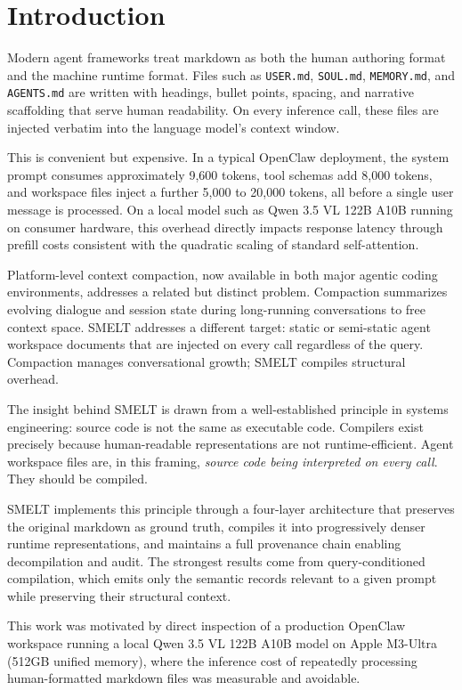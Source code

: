 \documentclass[11pt,a4paper]{article}
\begin{document}
\section{Introduction}

Modern agent frameworks treat markdown as both the human authoring format and the machine runtime format. Files such as \texttt{USER.md}, \texttt{SOUL.md}, \texttt{MEMORY.md}, and \texttt{AGENTS.md} are written with headings, bullet points, spacing, and narrative scaffolding that serve human readability. On every inference call, these files are injected verbatim into the language model's context window.

This is convenient but expensive. In a typical OpenClaw \citep{openclaw2026} deployment, the system prompt consumes approximately 9,600 tokens, tool schemas add 8,000 tokens, and workspace files inject a further 5,000 to 20,000 tokens, all before a single user message is processed. On a local model such as Qwen 3.5 VL 122B A10B running on consumer hardware, this overhead directly impacts response latency through prefill costs consistent with the quadratic scaling of standard self-attention.

Platform-level context compaction, now available in both major agentic coding environments, addresses a related but distinct problem. Compaction summarizes evolving dialogue and session state during long-running conversations to free context space. SMELT addresses a different target: static or semi-static agent workspace documents that are injected on every call regardless of the query. Compaction manages conversational growth; SMELT compiles structural overhead.

The insight behind SMELT is drawn from a well-established principle in systems engineering: source code is not the same as executable code. Compilers exist precisely because human-readable representations are not runtime-efficient. Agent workspace files are, in this framing, \textit{source code being interpreted on every call}. They should be compiled.

SMELT implements this principle through a four-layer architecture that preserves the original markdown as ground truth, compiles it into progressively denser runtime representations, and maintains a full provenance chain enabling decompilation and audit. The strongest results come from query-conditioned compilation, which emits only the semantic records relevant to a given prompt while preserving their structural context.

This work was motivated by direct inspection of a production OpenClaw workspace running a local Qwen 3.5 VL 122B A10B model on Apple M3-Ultra (512GB unified memory), where the inference cost of repeatedly processing human-formatted markdown files was measurable and avoidable.
\end{document}
